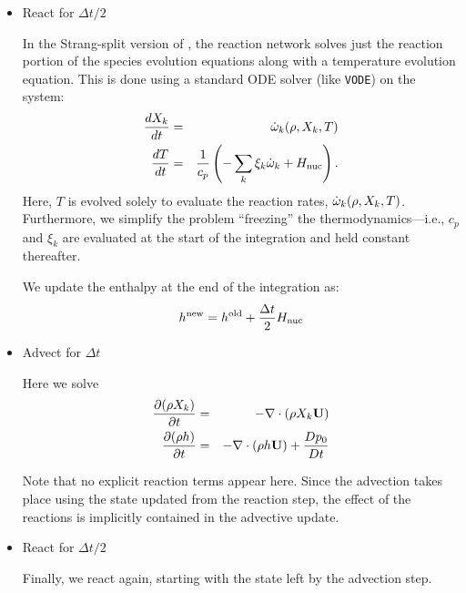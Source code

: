 \begin{itemize}

\item React for $\Delta t/2$

In the Strang-split version of \maestro, the reaction network solves just
the reaction portion of the species evolution equations along with a
temperature evolution equation.  This is done using a standard ODE solver
(like {\tt VODE}) on the system:
\begin{eqnarray}
\frac{dX_k}{dt} &=& \dot{\omega}_k(\rho,X_k,T) \\
\frac{dT}{dt}   &=& 
    \frac{1}{c_p} \left ( -\sum_k \xi_k  \dot{\omega}_k  + {H_{\rm nuc}} \right ).
\end{eqnarray}
Here, $T$ is evolved solely to evaluate the reaction rates,
$\dot{\omega}_k(\rho,X_k,T)$.  Furthermore, we simplify the problem
``freezing'' the thermodynamics---i.e., $c_p$ and $\xi_k$ are evaluated at the
start of the integration and held constant thereafter.

We update the enthalpy at the end of the integration as:
\begin{equation}
h^\mathrm{new} = h^\mathrm{old} + \frac{\Delta t}{2} {H_{\rm nuc}}
\end{equation}

\item Advect for $\Delta t$

Here we solve
\begin{eqnarray}
\frac{\partial(\rho X_k)}{\partial t} &=& 
    -\nabla\cdot(\rho X_k{\bf U}) \\
\frac{\partial(\rho h)}{\partial t} &=& 
    -\nabla\cdot(\rho h{\bf U}) + \frac{Dp_0}{Dt} 
\end{eqnarray}

Note that no explicit reaction terms appear here.  Since the advection
takes place using the state updated from the reaction step, the effect
of the reactions is implicitly contained in the advective update.

\item React for $\Delta t/2$

Finally, we react again, starting with the state left by the advection
step.

\end{itemize}

